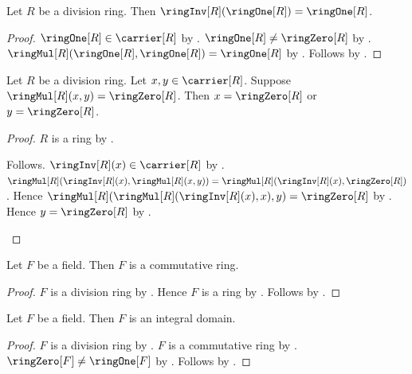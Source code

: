 \begin{proposition}\label{division_ring_inverse_one}
    Let $R$ be a division ring.
    Then $\ringInv[R](\ringOne[R])=\ringOne[R]$.
\end{proposition}
\begin{proof}
    $\ringOne[R]\in\carrier[R]$ by .
    $\ringOne[R]\neq\ringZero[R]$
        by .
    $\ringMul[R](\ringOne[R],\ringOne[R])=\ringOne[R]$
        by .
    Follows by .
\end{proof}

\begin{theorem}\label{division_ring_no_zero_divisors}
    Let $R$ be a division ring.
    Let $x,y\in\carrier[R]$.
    Suppose $\ringMul[R](x,y)=\ringZero[R]$.
    Then $x=\ringZero[R]$ or $y=\ringZero[R]$.
\end{theorem}
\begin{proof}
    $R$ is a ring by .
    \begin{byCase}
            Follows.
            $\ringInv[R](x)\in\carrier[R]$
                by .
            $\ringMul[R](\ringInv[R](x),\ringMul[R](x,y))
                =\ringMul[R](\ringInv[R](x),\ringZero[R])$.
            Hence
            $\ringMul[R](
                \ringMul[R](\ringInv[R](x),x),y)
                =\ringZero[R]$
                by
                .
            Hence $y=\ringZero[R]$
                by .
    \end{byCase}
\end{proof}

\begin{theorem}\label{field_is_commutative_ring}
    Let $F$ be a field.
    Then $F$ is a commutative ring.
\end{theorem}
\begin{proof}
    $F$ is a division ring by .
    Hence $F$ is a ring by .
    Follows by .
\end{proof}

\begin{theorem}\label{field_is_integral_domain}
    Let $F$ be a field.
    Then $F$ is an integral domain.
\end{theorem}
\begin{proof}
    $F$ is a division ring by .
    $F$ is a commutative ring by .
    $\ringZero[F]\neq\ringOne[F]$
        by .
    Follows by
        .
\end{proof}
